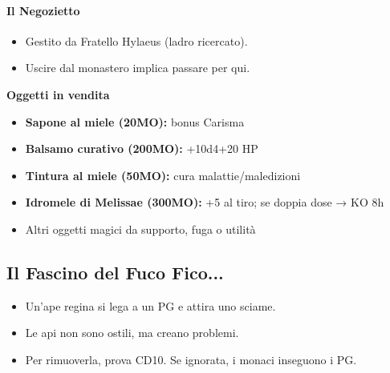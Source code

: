 \documentclass{article}
\begin{document}
\paragraph{Il Negozietto}
\begin{itemize}
    \item Gestito da Fratello Hylaeus (ladro ricercato).
    \item Uscire dal monastero implica passare per qui.
\end{itemize}

\textbf{Oggetti in vendita}
\begin{itemize}
    \item \textbf{Sapone al miele (20MO):} bonus Carisma
    \item \textbf{Balsamo curativo (200MO):} +10d4+20 HP
    \item \textbf{Tintura al miele (50MO):} cura malattie/maledizioni
    \item \textbf{Idromele di Melissae (300MO):} +5 al tiro; se doppia dose → KO 8h
    \item Altri oggetti magici da supporto, fuga o utilità
\end{itemize}

\subsection{Il Fascino del Fuco Fico...}
\begin{itemize}
    \item Un’ape regina si lega a un PG e attira uno sciame.
    \item Le api non sono ostili, ma creano problemi.
    \item Per rimuoverla, prova CD10. Se ignorata, i monaci inseguono i PG.
\end{itemize}
\end{document}
